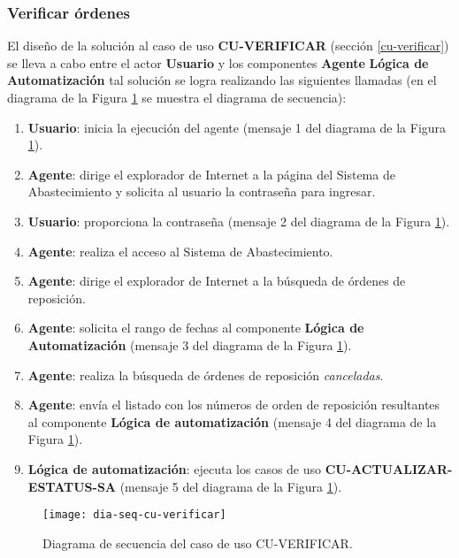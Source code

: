 \subsubsection{Verificar órdenes}
El diseño de la solución al caso de uso \textbf{CU-VERIFICAR} (sección \ref{cu-verificar}) se lleva a cabo entre el actor \textbf{Usuario} y los componentes \textbf{Agente} \textbf{Lógica de Automatización} tal solución se logra realizando las siguientes llamadas (en el diagrama de la Figura \ref{fig:dia-seq-cu-verificar} se muestra el diagrama de secuencia):
\begin{enumerate}
	\item \textbf{Usuario}: inicia la ejecución del agente (mensaje 1 del diagrama de la Figura \ref{fig:dia-seq-cu-verificar}).
	\item \textbf{Agente}: dirige el explorador de Internet a la página del Sistema de Abastecimiento y solicita al usuario la contraseña para ingresar.
	\item \textbf{Usuario}: proporciona la contraseña (mensaje 2 del diagrama de la Figura \ref{fig:dia-seq-cu-verificar}).
	\item \textbf{Agente}: realiza el acceso al Sistema de Abastecimiento.
	\item \textbf{Agente}: dirige el explorador de Internet a la búsqueda de órdenes de reposición.
	\item \textbf{Agente}: solicita el rango de fechas al componente \textbf{Lógica de Automatización} (mensaje 3 del diagrama de la Figura \ref{fig:dia-seq-cu-verificar}).
	\item \textbf{Agente}: realiza la búsqueda de órdenes de reposición \textit{canceladas}.
	\item \textbf{Agente}: envía el listado con los números de orden de reposición resultantes al componente \textbf{Lógica de automatización} (mensaje 4 del diagrama de la Figura \ref{fig:dia-seq-cu-verificar}).
	\item \textbf{Lógica de automatización}: ejecuta los casos de uso \textbf{CU-ACTUALIZAR-ESTATUS-SA} (mensaje 5 del diagrama de la Figura \ref{fig:dia-seq-cu-verificar}).
\end{enumerate}

\begin{figure}[h]
	\centering
	\texttt{[image: dia-seq-cu-verificar]}
	\caption{Diagrama de secuencia del caso de uso CU-VERIFICAR.}
	\label{fig:dia-seq-cu-verificar}
\end{figure}

